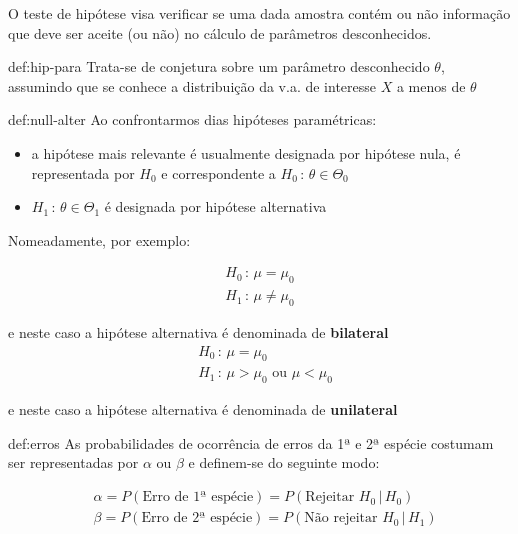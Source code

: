 \noindent O teste de hipótese visa verificar se uma dada amostra contém ou não informação que deve ser aceite (ou não) no cálculo de parâmetros desconhecidos.

\begin{theo}{def:hip-para}\label{def:hip-para}
    \noindent Trata-se de conjetura sobre um parâmetro desconhecido $\theta$, assumindo que se conhece a distribuição da v.a. de interesse $X$ a menos de $\theta$
\end{theo}

\vspace{-1em}
\begin{theo}{def:null-alter}\label{def:null-alter}
    \noindent Ao confrontarmos dias hipóteses paramétricas:
    \begin{itemize}
        \item a hipótese mais relevante é usualmente designada por hipótese nula, é representada por $H_0$ e correspondente a $H_0\,:\, \theta \in \Theta_0$
        \item $H_1\,:\, \theta \in \Theta_1$ é designada por hipótese alternativa
    \end{itemize}

\noindent Nomeadamente, por exemplo:

$$
    \begin{aligned}
        H_0\,:\, \mu = \mu_0\\
        H_1\,:\, \mu \neq \mu_0
    \end{aligned}
$$

\noindent e neste caso a hipótese alternativa é denominada de \textbf{bilateral}
$$
    \begin{aligned}
        &H_0\,:\, \mu = \mu_0\\
        &H_1\,:\, \mu > \mu_0 \text{ ou }\mu < \mu_0
    \end{aligned}
$$

\noindent e neste caso a hipótese alternativa é denominada de \textbf{unilateral}
\end{theo}

\vspace{-1em}
\begin{theo}{def:erros}\label{def:erros}
    \noindent As probabilidades de ocorrência de erros da 1ª e 2ª espécie costumam ser representadas por $\alpha$ ou $\beta$ e definem-se do seguinte modo:

    $$
        \begin{aligned}
            &\alpha = P(\text{Erro de 1ª espécie}) = P(\text{Rejeitar }H_0\,|\, H_0)\\
            &\beta = P(\text{Erro de 2ª espécie}) = P(\text{Não rejeitar }H_0\,|\, H_1)
        \end{aligned}
    $$
\end{theo}

